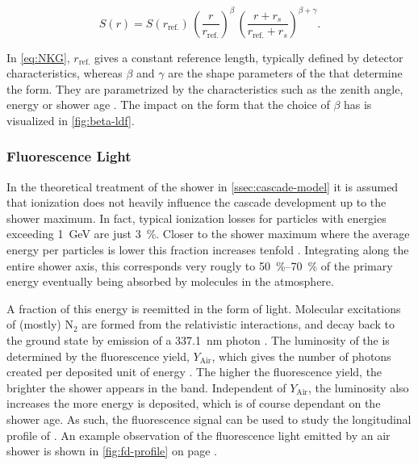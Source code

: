 \begin{equation}
\label{eq:NKG}
S(r) = S(r_\mathrm{ref.})\,\left( \frac{r}{r_\mathrm{ref.}}  \right)^\beta\,\left( \frac{r + r_s}{r_\mathrm{ref.} + r_s}  \right)^{\beta + \gamma}.
\end{equation}

In \cref{eq:NKG}, $r_\mathrm{ref.}$ gives a constant reference length, 
typically defined by detector characteristics, whereas $\beta$ and $\gamma$ are
the shape parameters of the \LDF that determine the \LDF form. They are
parametrized by the \EAS characteristics such as the zenith angle, energy or 
shower age \cite{jesusStudyMassComposition2025}. The impact on the \LDF form 
that the choice of $\beta$ has is visualized in \cref{fig:beta-ldf}. 

\subsubsection{Fluorescence Light}
\label{sssec:fluorescence-light}

In the theoretical treatment of the shower in \cref{ssec:cascade-model} it is 
assumed that ionization does not heavily influence the cascade development up 
to the shower maximum. In fact, typical ionization losses for particles with 
energies exceeding \SI{1}{\giga\eV} are just \SI{3}{\percent}. Closer to the 
shower maximum where the average energy per particles is lower this fraction 
increases tenfold \cite{risseEnergyReleaseAir2004}. Integrating along the 
entire shower axis, this corresponds very rougly to \SIrange{50}{70}{\percent} 
of the primary energy eventually being absorbed by molecules in the atmosphere.

A fraction of this energy is reemitted in the form of light. Molecular 
excitations of (mostly) N$_2$ are formed from the relativistic interactions,
and decay back to the ground state by emission of a \SI{337.1}{\nano\meter} 
photon \cite{leanContributionUltravioletIrradiance1989, 
aveSpectrallyResolvedPressure2008}. The \UV luminosity of the \EAS is 
determined by the fluorescence yield, $Y_\mathrm{Air}$, which gives the number 
of photons created per deposited unit of energy 
\cite{keilhauerNitrogenFluorescenceAir2013}. The higher the fluorescence yield,
the brighter the shower appears in the \UV band. Independent of
$Y_\mathrm{Air}$, the luminosity also increases the more energy is deposited,
which is of course dependant on the shower age. As such, the fluorescence 
signal can be used to study the longitudinal profile of \EASs. An example
observation of the fluorescence light emitted by an air shower is shown in
\cref{fig:fd-profile} on page \pageref{fig:fd-profile}.

